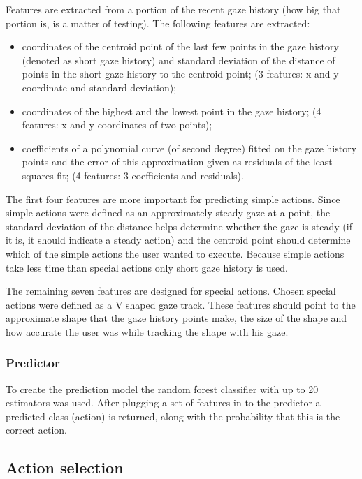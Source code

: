 \documentclass[a4paper,11pt]{article}
\begin{document}
Features are extracted from a portion of the recent gaze history (how big that portion is, is a matter of testing). The following features are extracted:

\begin{itemize}
\item coordinates of the centroid point of the last few points in the gaze history (denoted as short gaze history) and standard deviation of the distance of points in the short gaze history to the centroid point; (3 features: x and y coordinate and standard deviation);

\item coordinates of the highest and the lowest point in the gaze history; (4 features: x and y coordinates of two points);

\item coefficients of a polynomial curve (of second degree) fitted on the gaze history points and the error of this approximation given as residuals of the least-squares fit; (4 features: 3 coefficients and residuals).
\end{itemize}

The first four features are more important for predicting simple actions. Since simple actions were defined as an approximately steady gaze at a point, the standard deviation of the distance helps determine whether the gaze is steady (if it is, it should indicate a steady action) and the centroid point should determine which of the simple actions the user wanted to execute. Because simple actions take less time than special actions only short gaze history is used.

The remaining seven features are designed for special actions. Chosen special actions were defined as a V shaped gaze track. These features should point to the approximate shape that the gaze history points make, the size of the shape and how accurate the user was while tracking the shape with his gaze.

\subsubsection{Predictor}

To create the prediction model the random forest classifier with up to 20 estimators was used. After plugging a set of features in to the predictor a predicted class (action) is returned, along with the probability that this is the correct action.

\subsection{Action selection}
\end{document}
